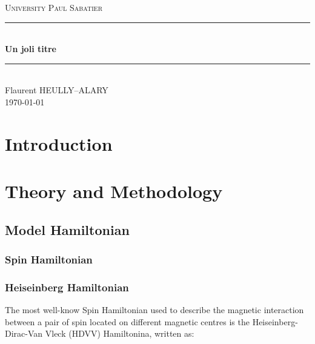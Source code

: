 \documentclass[10pt]{report}
\numberwithin{equation}{section}
\newcommand{\noun}[1]{\textsc{#1}}
\begin{document}

\begin{titlepage}
\newcommand{\HRule}{\rule{\linewidth}{0.5mm}}
\center
\textsc{\LARGE
University \noun{Paul Sabatier}
} \\[1cm]
\HRule\\[0.4cm]
{ \huge \bfseries Un joli titre \\[0.15cm] }
\HRule\\[1.5cm]
Flaurent HEULLY--ALARY
\\[1cm]
\today \\ [1cm]
\end{titlepage}
\begin{center}
\thispagestyle{plain}
\par\end{center}
\large
\tableofcontents
\newpage
\chapter{Introduction}

\chapter{Theory and Methodology}

\section{Model Hamiltonian}

\subsection{Spin Hamiltonian}

\subsection*{Heiseinberg Hamiltonian}
The most well-know Spin Hamiltonian used to describe the magnetic interaction between a pair of spin located on different magnetic centres is the Heiseinberg-Dirac-Van Vleck (HDVV) Hamiltonina, written as:
\end{document}
